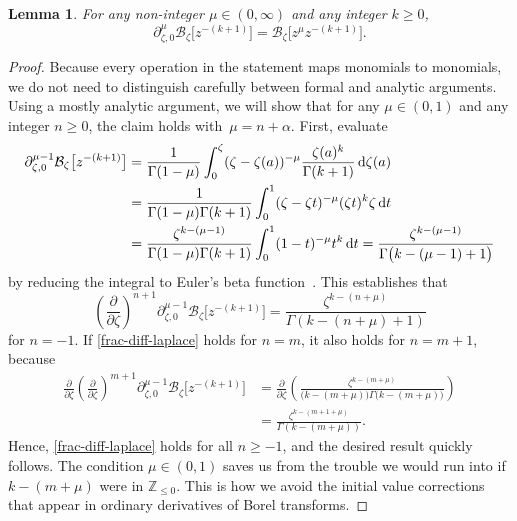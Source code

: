 \documentclass[10pt,a4paper]{amsart}
\newcommand{\Z}{\mathbb{Z}}
\newcommand{\borel}{\mathcal{B}}
\numberwithin{equation}{section}
\newtheorem{Lemma}[Theorem]{Lemma}
\begin{document}
\begin{Lemma}\label{lem:frac-deriv-Borel}
For any non-integer $\mu \in (0, \infty)$ and any integer $k \ge 0$,
\[
\partial^\mu_{\zeta,0} \borel_\zeta \bigl[z^{-(k+1)}\bigr] = \borel_\zeta \bigl[z^\mu z^{-(k+1)}\bigr].\]
\end{Lemma}
\begin{proof}
Because every operation in the statement maps monomials to monomials, we do not need to distinguish carefully between formal and analytic arguments. Using a mostly analytic argument, we will show that for any $\mu \in (0, 1)$ and any integer $n \ge 0$, the claim holds with~${\mu = n + \alpha}$. First, evaluate
\begin{align*}
\partial^{\mu-1}_{\zeta,0} \borel_\zeta \bigl[z^{-(k+1)}\bigr] & = \frac{1}{\Gamma(1-\mu)} \int_0^\zeta (\zeta-\zeta(a))^{-\mu} \frac{\zeta(a)^k}{\Gamma(k+1)} \,{\rm d}\zeta(a) \\
& = \frac{1}{\Gamma(1-\mu) \Gamma(k+1)} \int_0^1 (\zeta-\zeta t)^{-\mu} (\zeta t)^k \zeta \,{\rm d}t \\
& = \frac{\zeta^{k-(\mu-1)}}{\Gamma(1-\mu) \Gamma(k+1)} \int_0^1 (1-t)^{-\mu} t^k \,{\rm d}t = \frac{\zeta^{k-(\mu-1)}}{\Gamma\bigl(k-(\mu-1)+1\bigr)}
\end{align*}
by reducing the integral to Euler's beta function~\cite[identity (5.12.1)]{dlmf}. This establishes that
\begin{equation}\label{frac-diff-laplace}
\left(\frac{\partial}{\partial \zeta}\right)^{n+1} \partial^{\mu-1}_{\zeta,0} \borel_\zeta \bigl[z^{-(k+1)}\bigr] = \frac{\zeta^{k-(n+\mu)}}{\Gamma(k-(n+\mu)+1)}
\end{equation}
for $n = -1$. If \eqref{frac-diff-laplace} holds for $n = m$, it also holds for $n = m+1$, because
\begin{align*}
\frac{\partial}{\partial \zeta} \left(\frac{\partial}{\partial \zeta}\right)^{m+1} \partial^{\mu-1}_{\zeta,0} \borel_\zeta \bigl[z^{-(k+1)}\bigr] & = \frac{\partial}{\partial \zeta} \left( \frac{\zeta^{k-(m+\mu)}}{\bigl(k-(m+\mu)\bigr) \Gamma\bigl(k-(m+\mu)\bigr)} \right)\\
& = \frac{\zeta^{k-(m+1+\mu)}}{\Gamma(k-(m+\mu))}.
\end{align*}
Hence, \eqref{frac-diff-laplace} holds for all $n \ge -1$, and the desired result quickly follows. The condition $\mu \in (0, 1)$ saves us from the trouble we would run into if $k-(m+\mu)$ were in $\Z_{\le 0}$. This is how we avoid the initial value corrections that appear in ordinary derivatives of Borel transforms.
\end{proof}
\end{document}
